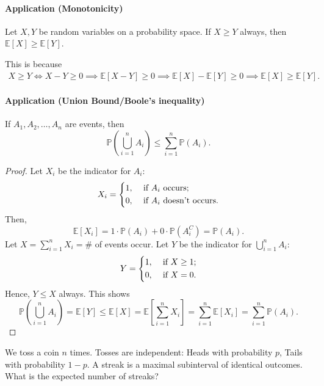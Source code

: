 \paragraph{Application (Monotonicity)} Let \(X, Y\) be random variables on a probability space. If \(X \ge Y\) always, then \(\mathbb{E} [X] \ge \mathbb{E} [Y]\). 

This is because 
\begin{align*}
    X \ge Y \iff X - Y \ge 0 \implies \mathbb{E} [X - Y] \ge 0 \implies \mathbb{E} [X] - \mathbb{E} [Y] \ge 0 \implies \mathbb{E} [X] \ge \mathbb{E} [Y].
\end{align*}

\paragraph{Application (Union Bound/Boole's inequality)}
If \(A_1, A_2, \dots , A_n\) are events, then 
\[
    \mathbb{P} \left( \bigcup_{i=1}^{n} A_i  \right) \le \sum_{i=1}^n \mathbb{P} (A_i).  
\] 
\begin{proof}
    Let \(X_i\) be the indicator for \(A_i\):
    \[
        X_i = \begin{dcases}
            1, &\text{ if } A_i \text{ occurs}  ;\\
            0, &\text{ if } A_i \text{ doesn't occurs}.
        \end{dcases}
    \]  
    Then,
    \[
        \mathbb{E} [X_i] = 1 \cdot \mathbb{P} (A_i) + 0 \cdot \mathbb{P} (A_i^C) = \mathbb{P} (A_i).
    \]
    Let \(X = \sum_{i=1}^n X_i = \#\) of events occur. Let \(Y\) be the indicator for \(\bigcup_{i=1}^{n} A_i \):
    \[
        Y = \begin{dcases}
            1, &\text{ if } X \ge 1 ;\\
            0, &\text{ if } X = 0.
        \end{dcases}
    \]  
    Hence, \(Y \le X\) always. This shows 
    \[
        \mathbb{P} \left( \bigcup_{i=1}^{n} A_i  \right) = \mathbb{E} [Y] \le \mathbb{E} [X] = \mathbb{E} \left[ \sum_{i=1}^n X_i  \right] = \sum_{i=1}^n \mathbb{E} [X_i] = \sum_{i=1}^n \mathbb{P} (A_i).    
    \] 
\end{proof}

\begin{eg}
    We toss a coin \(n\) times. Tosses are independent: Heads with probability \(p\), Tails with probability \(1 - p\). A streak is a maximal subinterval of identical outcomes. What is the expected number of streaks?    
\end{eg}

